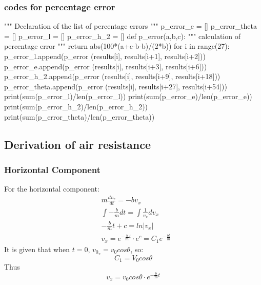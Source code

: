 \documentclass[conference]{IEEEtran}
\begin{document}
    \subsubsection{codes for percentage error}\label{code:p_error}
    \begin{python}
"""
Declaration of the list
of percentage errors
"""
p_error_e = []
p_error_theta = []
p_error_l = []
p_error_h_2 = []
def p_error(a,b,c):
"""
calculation of percentage error
"""
    return abs(100*(a+c-b-b)/(2*b))
for i in range(27):
    p_error_l.append(p_error
                    (results[i],
                    results[i+1],
                    results[i+2]))
    p_error_e.append(p_error
                    (results[i],
                    results[i+3],
                    results[i+6]))
    p_error_h_2.append(p_error
                       (results[i],
                        results[i+9],
                        results[i+18]))
    p_error_theta.append(p_error
                         (results[i],
                          results[i+27],
                          results[i+54]))
print(sum(p_error_l)/len(p_error_l))
print(sum(p_error_e)/len(p_error_e))   
print(sum(p_error_h_2)/len(p_error_h_2))  
print(sum(p_error_theta)/len(p_error_theta)) 
    \end{python}
    \subsection{Derivation of air resistance}\label{derviair}
        \subsubsection{Horizontal Component}
        For the horizontal component:
        \begin{equation}
            \begin{aligned}
                &m\frac{dv_x}{dt}= -bv_x\\
                &\int-\frac{b}{m}dt = \int\frac{1}{v_x}dv_x\\
                &-\frac{b}{m}t+c = ln |v_x|\\
                &v_x = e^{-\frac{b}{m}t}\cdot e^c = C_1e^{-\frac{bt}{m}}
            \end{aligned}
        \end{equation}
        It is given that when $t = 0$, $v_{0_x} = v_0cos\theta$, so:
        $$C_1 = V_0cos\theta$$
        Thus
        \begin{equation} \label{x_air}
            v_x = v_0cos\theta \cdot e^{-\frac{b}{m}t}
        \end{equation}
\end{document}
